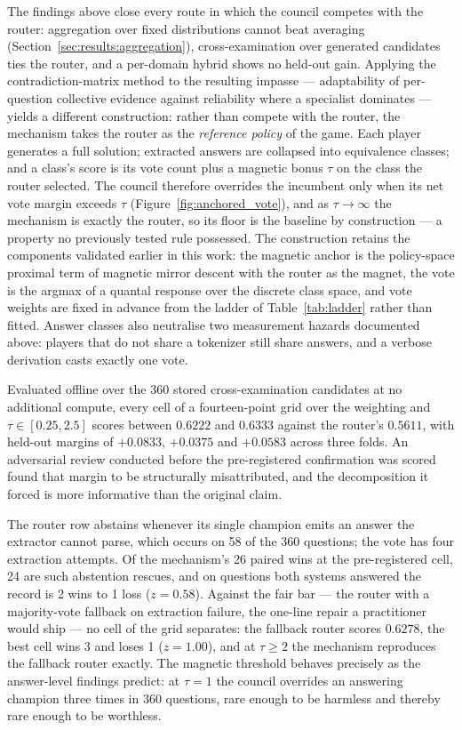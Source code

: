 The findings above close every route in which the council competes with the
router: aggregation over fixed distributions cannot beat averaging
(Section~\ref{sec:results:aggregation}), cross-examination over generated
candidates ties the router, and a per-domain hybrid shows no held-out gain.
Applying the contradiction-matrix method to the resulting impasse --- adaptability
of per-question collective evidence against reliability where a specialist
dominates --- yields a different construction: rather than compete with the
router, the mechanism takes the router as the \emph{reference policy} of the
game. Each player generates a full solution; extracted answers are collapsed
into equivalence classes; and a class's score is its vote count plus a magnetic
bonus $\tau$ on the class the router selected. The council therefore overrides
the incumbent only when its net vote margin exceeds $\tau$
(Figure~\ref{fig:anchored_vote}), and as
$\tau \to \infty$ the mechanism is exactly the router, so its floor is the
baseline by construction --- a property no previously tested rule possessed.
The construction retains the components validated earlier in this work: the
magnetic anchor is the policy-space proximal term of magnetic mirror descent
with the router as the magnet, the vote is the argmax of a quantal response
over the discrete class space, and vote weights are fixed in advance from the
ladder of Table~\ref{tab:ladder} rather than fitted. Answer classes also
neutralise two measurement hazards documented above: players that do not share
a tokenizer still share answers, and a verbose derivation casts exactly one
vote.

Evaluated offline over the 360 stored cross-examination candidates at no
additional compute, every cell of a fourteen-point grid over the weighting and
$\tau \in [0.25, 2.5]$ scores between $0.6222$ and $0.6333$ against the
router's $0.5611$, with held-out margins of $+0.0833$, $+0.0375$ and $+0.0583$
across three folds. An adversarial review conducted before the pre-registered
confirmation was scored found that margin to be structurally misattributed, and
the decomposition it forced is more informative than the original claim.

The router row abstains whenever its single champion emits an answer the
extractor cannot parse, which occurs on 58 of the 360 questions; the vote has
four extraction attempts. Of the mechanism's 26 paired wins at the
pre-registered cell, 24 are such abstention rescues, and on questions both
systems answered the record is 2 wins to 1 loss ($z = 0.58$). Against the fair
bar --- the router with a majority-vote fallback on extraction failure, the
one-line repair a practitioner would ship --- no cell of the grid separates:
the fallback router scores $0.6278$, the best cell wins 3 and loses 1
($z = 1.00$), and at $\tau \geq 2$ the mechanism reproduces the fallback
router exactly. The magnetic threshold behaves precisely as the answer-level
findings predict: at $\tau = 1$ the council overrides an answering champion
three times in 360 questions, rare enough to be harmless and thereby rare
enough to be worthless.

